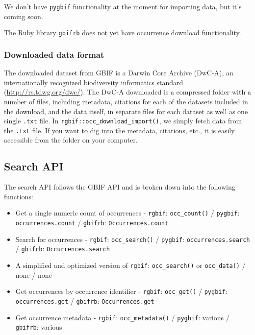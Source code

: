 \documentclass[3p]{elsarticle} %
\providecommand{\tightlist}{%
  \setlength{\itemsep}{0pt}\setlength{\parskip}{0pt}}
\begin{document}
We don't have \texttt{pygbif} functionality at the moment for importing
data, but it's coming soon.

The Ruby library \texttt{gbifrb} does not yet have occurrence download
functionality.

\hypertarget{downloaded-data-format}{%
\subsubsection{Downloaded data format}\label{downloaded-data-format}}

The downloaded dataset from GBIF is a Darwin Core Archive (DwC-A), an
internationally recognized biodiversity informatics standard
(\url{http://rs.tdwg.org/dwc/}). The DwC-A downloaded is a compressed
folder with a number of files, including metadata, citations for each of
the datasets included in the download, and the data itself, in separate
files for each dataset as well as one single \texttt{.txt} file. In
\texttt{rgbif::occ\_download\_import()}, we simply fetch data from the
\texttt{.txt} file. If you want to dig into the metadata, citations,
etc., it is easily accessible from the folder on your computer.

\hypertarget{search-api}{%
\subsection{Search API}\label{search-api}}

The search API follows the GBIF API and is broken down into the
following functions:

\begin{itemize}
\tightlist
\item
  Get a single numeric count of occurrences - \texttt{rgbif}:
  \texttt{occ\_count()} / \texttt{pygbif}: \texttt{occurrences.count} /
  \texttt{gbifrb}: \texttt{Occurrences.count}
\item
  Search for occurrences - \texttt{rgbif}: \texttt{occ\_search()} /
  \texttt{pygbif}: \texttt{occurrences.search} / \texttt{gbifrb}:
  \texttt{Occurrences.search}
\item
  A simplified and optimized version of \texttt{rgbif}:
  \texttt{occ\_search()} or \texttt{occ\_data()} / none / none
\item
  Get occurrences by occurrence identifier - \texttt{rgbif}:
  \texttt{occ\_get()} / \texttt{pygbif}: \texttt{occurrences.get} /
  \texttt{gbifrb}: \texttt{Occurrences.get}
\item
  Get occurrence metadata - \texttt{rgbif}: \texttt{occ\_metadata()} /
  \texttt{pygbif}: various / \texttt{gbifrb}: various
\end{itemize}
\end{document}
